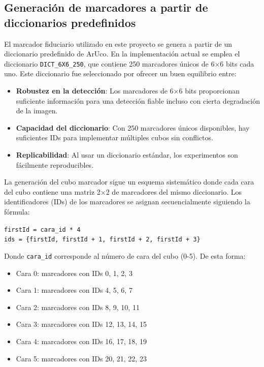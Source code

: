 \subsection{Generación de marcadores a partir de diccionarios predefinidos}
El marcador fiduciario utilizado en este proyecto se genera a partir de un diccionario predefinido de ArUco. En la implementación actual se emplea el diccionario \texttt{DICT\_6X6\_250}, que contiene 250 marcadores únicos de 6×6 bits cada uno. Este diccionario fue seleccionado por ofrecer un buen equilibrio entre:

\begin{itemize}
    \item \textbf{Robustez en la detección}: Los marcadores de 6×6 bits proporcionan suficiente información para una detección fiable incluso con cierta degradación de la imagen.
    \item \textbf{Capacidad del diccionario}: Con 250 marcadores únicos disponibles, hay suficientes IDs para implementar múltiples cubos sin conflictos.
    \item \textbf{Replicabilidad}: Al usar un diccionario estándar, los experimentos son fácilmente reproducibles.
\end{itemize}

La generación del cubo marcador sigue un esquema sistemático donde cada cara del cubo contiene una matriz 2×2 de marcadores del mismo diccionario. Los identificadores (IDs) de los marcadores se asignan secuencialmente siguiendo la fórmula:

\begin{center}
\texttt{firstId = cara\_id * 4}\\
\texttt{ids = \{firstId, firstId + 1, firstId + 2, firstId + 3\}}
\end{center}

Donde \texttt{cara\_id} corresponde al número de cara del cubo (0-5). De esta forma:
\begin{itemize}
	\item Cara 0: marcadores con IDs 0, 1, 2, 3
	\item Cara 1: marcadores con IDs 4, 5, 6, 7
	\item Cara 2: marcadores con IDs 8, 9, 10, 11
	\item Cara 3: marcadores con IDs 12, 13, 14, 15
	\item Cara 4: marcadores con IDs 16, 17, 18, 19
	\item Cara 5: marcadores con IDs 20, 21, 22, 23
\end{itemize}

